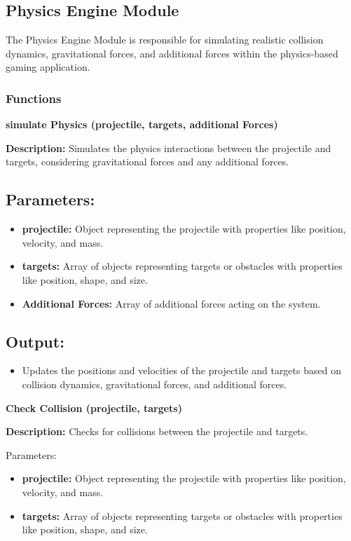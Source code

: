 \documentclass[12pt, titlepage]{article}
\begin{document}
\subsection{Physics Engine Module}
The Physics Engine Module is responsible for simulating realistic collision dynamics, gravitational forces, and additional forces within the physics-based gaming application.

\subsubsection{Functions}
\textbf{simulate Physics (projectile, targets, additional Forces)}

\textbf{Description:} Simulates the physics interactions between the projectile and targets, considering gravitational forces and any additional forces.

\subsection*{Parameters:}
\begin{itemize}
  \item \textbf{projectile:} Object representing the projectile with properties like position, velocity, and mass.
  \item \textbf{targets:} Array of objects representing targets or obstacles with properties like position, shape, and size.
  \item \textbf{Additional Forces:} Array of additional forces acting on the system.
\end{itemize}

\subsection*{Output:}
\begin{itemize}
  \item Updates the positions and velocities of the projectile and targets based on collision dynamics, gravitational forces, and additional forces.
\end{itemize}

\textbf{Check Collision (projectile, targets)}

\textbf{Description:} Checks for collisions between the projectile and targets.

Parameters:

\begin{itemize}
  \item \textbf{projectile:} Object representing the projectile with properties like position, velocity, and mass.
  \item \textbf{targets:} Array of objects representing targets or obstacles with properties like position, shape, and size.
\end{itemize}
\end{document}
